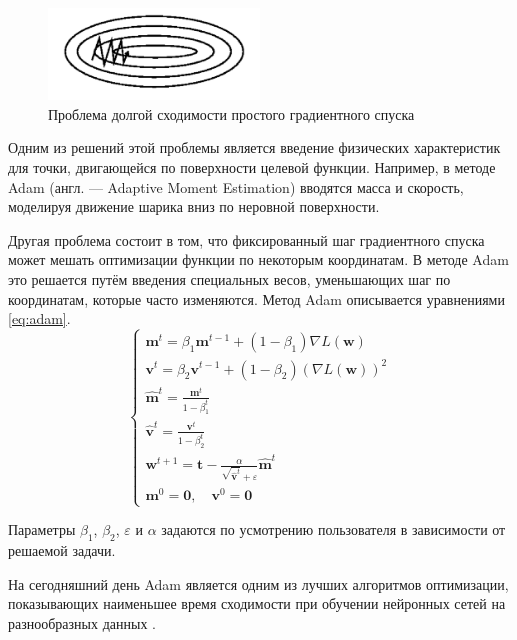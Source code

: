 \begin{figure}
    \centering
    \includegraphics[width=0.5\textwidth]{../inc/images/gradient_descend_problem.png}
    \caption{Проблема долгой сходимости простого градиентного спуска}
    \label{fig:grad_desc_problem}
\end{figure}

Одним из решений этой проблемы является введение физических характеристик для точки, двигающейся по поверхности целевой функции. Например, в методе Adam (англ. --- Adaptive Moment Estimation) вводятся масса и скорость, моделируя движение шарика вниз по неровной поверхности.

Другая проблема состоит в том, что фиксированный шаг градиентного спуска может мешать оптимизации функции по некоторым координатам. В методе Adam это решается путём введения специальных весов, уменьшающих шаг по координатам, которые часто изменяются. Метод Adam описывается уравнениями \ref*{eq:adam}.
\begin{equation}
    \label{eq:adam}
    \begin{cases}
        \mathbf{m}^t=\beta_1\mathbf{m}^{t-1}+(1-\beta_1)\nabla L(\mathbf{w}) \\
        \mathbf{v}^t=\beta_2\mathbf{v}^{t-1}+(1-\beta_2)(\nabla L(\mathbf{w}))^2 \\
        \hat{\mathbf{m}}^t=\frac{\mathbf{m}^t}{1-\beta_1^t} \\
        \hat{\mathbf{v}}^t=\frac{\mathbf{v}^t}{1-\beta_2^t} \\
        \mathbf{w}^{t+1}=\mathbf{t}-\frac{\alpha}{\sqrt{\hat{\mathbf{v}}^t}+\varepsilon}\hat{\mathbf{m}}^t \\
        \mathbf{m}^0=\mathbf{0},\quad\mathbf{v}^0=\mathbf{0}
    \end{cases}
\end{equation}

Параметры $\beta_1$, $\beta_2$, $\varepsilon$ и $\alpha$ задаются по усмотрению пользователя в зависимости от решаемой задачи.

На сегодняшний день Adam является одним из лучших алгоритмов оптимизации, показывающих наименьшее время сходимости при обучении нейронных сетей на разнообразных данных \cite{art:optimizers}.

